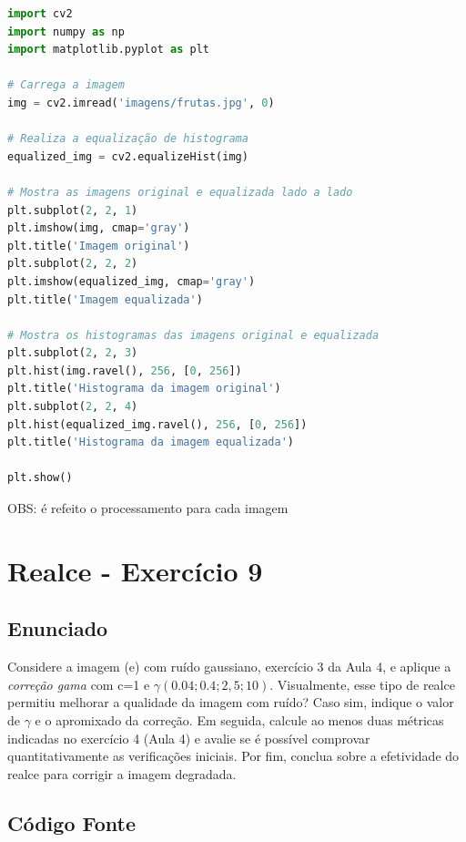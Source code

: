 \documentclass[10pt,a4paper]{article}
\begin{document}
\begin{lstlisting}[language=Python]
import cv2
import numpy as np
import matplotlib.pyplot as plt

# Carrega a imagem
img = cv2.imread('imagens/frutas.jpg', 0)

# Realiza a equalização de histograma
equalized_img = cv2.equalizeHist(img)

# Mostra as imagens original e equalizada lado a lado
plt.subplot(2, 2, 1)
plt.imshow(img, cmap='gray')
plt.title('Imagem original')
plt.subplot(2, 2, 2)
plt.imshow(equalized_img, cmap='gray')
plt.title('Imagem equalizada')

# Mostra os histogramas das imagens original e equalizada
plt.subplot(2, 2, 3)
plt.hist(img.ravel(), 256, [0, 256])
plt.title('Histograma da imagem original')
plt.subplot(2, 2, 4)
plt.hist(equalized_img.ravel(), 256, [0, 256])
plt.title('Histograma da imagem equalizada')

plt.show()
\end{lstlisting}

\begin{flushleft}
OBS: é refeito o processamento para cada imagem
\end{flushleft}

\pagebreak

\section{Realce - Exercício 9}

\subsection{Enunciado}

Considere a imagem (e) com ruído gaussiano, exercício 3 da Aula 4, e aplique a \textit{correção gama} com c=1 e \( {\gamma} (0.04; 0.4; 2,5; 10)\). Visualmente, esse tipo de realce permitiu melhorar a qualidade da imagem com ruído? Caso sim, indique o valor de \({\gamma}\) e o apromixado da correção. Em seguida, calcule ao menos duas métricas indicadas no exercício 4 (Aula 4) e avalie se é possível comprovar quantitativamente as verificações iniciais. Por fim, conclua sobre a efetividade do realce para corrigir a imagem degradada.

\subsection{Código Fonte}
\end{document}
